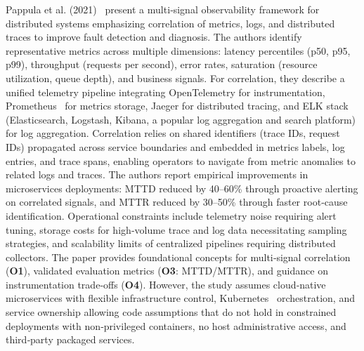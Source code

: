 \documentclass[12pt]{article}
\begin{document}
Pappula et al. (2021)~\cite{pappula2021building} present a multi‑signal observability framework for distributed systems emphasizing correlation of metrics, logs, and distributed traces to improve fault detection and diagnosis. The authors identify representative metrics across multiple dimensions: latency percentiles (p50, p95, p99), throughput (requests per second), error rates, saturation (resource utilization, queue depth), and business signals. For correlation, they describe a unified telemetry pipeline integrating \gls{OpenTelemetry} for instrumentation, Prometheus~\cite{prometheus2016} for metrics storage, Jaeger for distributed tracing, and ELK stack (Elasticsearch, Logstash, Kibana, a popular log aggregation and search platform) for log aggregation. Correlation relies on shared identifiers (trace IDs, request IDs) propagated across service boundaries and embedded in metrics labels, log entries, and trace spans, enabling operators to navigate from metric anomalies to related logs and traces. The authors report empirical improvements in microservices deployments: \ac{MTTD} reduced by 40–60\% through proactive alerting on correlated signals, and \ac{MTTR} reduced by 30–50\% through faster root‑cause identification. Operational constraints include telemetry noise requiring alert tuning, storage costs for high‑volume trace and log data necessitating sampling strategies, and scalability limits of centralized pipelines requiring distributed collectors. The paper provides foundational concepts for multi‑signal correlation (\textbf{O1}), validated evaluation metrics (\textbf{O3}: \ac{MTTD}/\ac{MTTR}), and guidance on instrumentation trade‑offs (\textbf{O4}). However, the study assumes cloud‑native microservices with flexible infrastructure control, Kubernetes~\cite{kubernetes2015} orchestration, and service ownership allowing code assumptions that do not hold in constrained deployments with non‑privileged containers, no host administrative access, and third‑party packaged services.
\end{document}
